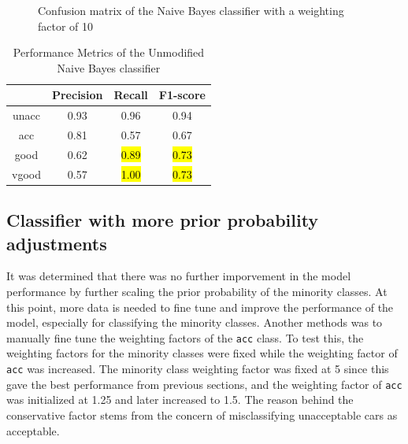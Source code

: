 \documentclass[a4paper]{article}
\begin{document}
\begin{figure} [h!]
  \caption{Confusion matrix of the Naive Bayes classifier with a weighting factor of 10} 
  \label{fig:NBCcm_10}
\end{figure}


\begin{table}[h!]
  \centering
  \caption{Performance Metrics of the Unmodified Naive Bayes classifier}
  \label{tab:nb_performance_10}
  \begin{tabular}{||cccc||}
  \hline
  \textbf{ } & \textbf{Precision} & \textbf{Recall} & \textbf{F1-score} \\
  \hline \hline
  unacc & 0.93 & 0.96 & 0.94\\ \hline
  acc  & 0.81 & 0.57 & 0.67\\ \hline
  good & 0.62 & \hl{0.89} & \hl{0.73}\\ \hline
  vgood & 0.57 & \hl{1.00} & \hl{0.73}\\ \hline
  \end{tabular}
\end{table}

\subsection{Classifier with more prior probability adjustments} 
It was determined that there was no further imporvement in the model performance by further scaling the prior probability of the minority classes. At this point, more data is needed to fine tune and improve the performance of the model, especially for classifying the minority classes. Another methods was to manually fine tune the weighting factors of the \lstinline{acc} class. To test this, the weighting factors for the minority classes were fixed while the weighting factor of \lstinline{acc} was increased. The minority class weighting factor was fixed at 5 since this gave the best performance from previous sections, and the weighting factor of \lstinline{acc} was initialized at 1.25 and later increased to 1.5. The reason behind the conservative factor stems from the concern of misclassifying unacceptable cars as acceptable.
\end{document}
